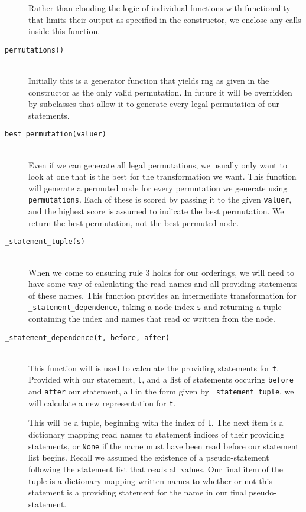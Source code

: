 \documentclass{report}
\begin{document}
\begin{description}
Rather than clouding the logic of individual functions with functionality that limits their output as specified in the constructor, we enclose any calls
inside this function.

\item[\texttt{permutations()}] \hfill \\
Initially this is a generator function that yields rng as given in the constructor as the only valid permutation. In future it will be overridden by
subclasses that allow it to generate every legal permutation of our statements.

\item[\texttt{best\_permutation(valuer)}] \hfill \\
Even if we can generate all legal permutations, we usually only want to look at one that is the best for the transformation we want. This function
will generate a permuted node for every permutation we generate using \texttt{permutations}. Each of these is scored by passing it to the given
\texttt{valuer}, and the highest score is assumed to indicate the best permutation. We return the best permutation, not the best permuted node.

\item[\texttt{\_statement\_tuple(s)}] \hfill \\
When we come to ensuring rule 3 holds for our orderings, we will need to have some way of calculating the read names and all providing statements
of these names. This function provides an intermediate transformation for \texttt{\_statement\_dependence}, taking a node index \texttt{s} and
returning a tuple containing the index and names that read or written from the node.

\item[\texttt{\_statement\_dependence(t, before, after)}] \hfill \\
This function will is used to calculate the providing statements for \texttt{t}. Provided with our statement, \texttt{t}, and a list of statements
occuring \texttt{before} and \texttt{after} our statement, all in the form given by \texttt{\_statement\_tuple}, we will calculate a new representation
for \texttt{t}.

This will be a tuple, beginning with the index of \texttt{t}. The next item is a dictionary mapping read names to statement indices of their providing
statements, or \texttt{None} if the name must have been read before our statement list begins. Recall we assumed the existence of a pseudo-statement
following the statement list that reads all values. Our final item of the tuple is a dictionary mapping written names to whether or not this statement
is a providing statement for the name in our final pseudo-statement.
\end{description}
\end{document}
